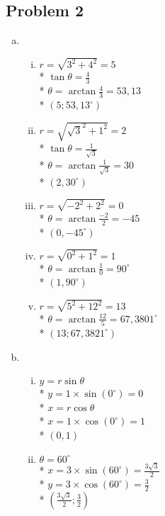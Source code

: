 \documentclass[a4paper]{article}
\begin{document}
  \subsection*{Problem 2}
  \begin{enumerate}[a)]
    \item 
    \begin{enumerate}[i.]
      \item $r = \sqrt{3^{2}+4^{2}} = 5$\\*
      $\tan \theta = \frac{4}{3}$\\* 
      $\theta = \arctan \frac{4}{3} = 53,13$\\*
      $(5;53,13^{\circ})$

      \item $r = \sqrt{\sqrt{3}^{2} + 1^{2}} = 2$\\*
      $\tan \theta = \frac{1}{\sqrt{3}}$\\*
      $\theta = \arctan \frac{1}{\sqrt{3}} = 30$\\*
      $(2,30^{\circ})$

      \item $r = \sqrt{-2^{2} + 2^{2}} = 0$\\*
      $\theta = \arctan \frac{-2}{2} = -45$\\*
      $(0,-45^{\circ})$

      \item $r = \sqrt{0^{2} + 1^{2}} = 1$\\*
      $\theta = \arctan \frac{1}{0} = 90^{\circ}$\\*
      $(1,90^{\circ})$

      \item $r = \sqrt{5^{2} + 12^{2}} = 13$\\*
      $\theta = \arctan \frac{12}{5} = 67,3801^{\circ}$\\*
      $(13;67,3821^{\circ})$
    \end{enumerate}
    \item 
    \begin{enumerate}[vi.]
      \item $y = r \sin \theta$\\*
      $y = 1 \times \sin (0^{\circ}) = 0$\\*
      $x = r \cos \theta$\\*
      $x = 1 \times \cos (0^{\circ}) = 1$\\*
      $(0,1)$

      \item $\theta = 60^{\circ}$\\*
      $x = 3 \times \sin (60^{\circ}) = \frac{3\sqrt{3}}{2}$\\*
      $y = 3 \times \cos (60^{\circ}) = \frac{3}{2}$\\*
      $(\frac{3\sqrt{3}}{2};\frac{3}{2})$


\end{enumerate}
\end{enumerate}
\end{document}
